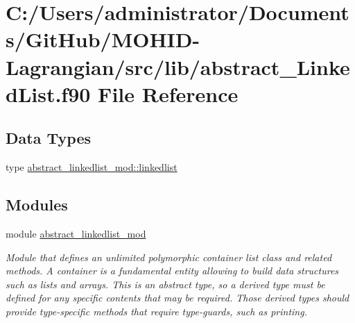 \hypertarget{abstract___linked_list_8f90}{}\section{C\+:/\+Users/administrator/\+Documents/\+Git\+Hub/\+M\+O\+H\+I\+D-\/\+Lagrangian/src/lib/abstract\+\_\+\+Linked\+List.f90 File Reference}
\label{abstract___linked_list_8f90}
\subsection*{Data Types}
\begin{DoxyCompactItemize}
\item 
type \mbox{\hyperlink{structabstract__linkedlist__mod_1_1linkedlist}{abstract\+\_\+linkedlist\+\_\+mod\+::linkedlist}}
\end{DoxyCompactItemize}
\subsection*{Modules}
\begin{DoxyCompactItemize}
\item 
module \mbox{\hyperlink{namespaceabstract__linkedlist__mod}{abstract\+\_\+linkedlist\+\_\+mod}}
\begin{DoxyCompactList}\small\item\em Module that defines an unlimited polymorphic container list class and related methods. A container is a fundamental entity allowing to build data structures such as lists and arrays. This is an abstract type, so a derived type must be defined for any specific contents that may be required. Those derived types should provide type-\/specific methods that require type-\/guards, such as printing. \end{DoxyCompactList}\end{DoxyCompactItemize}
